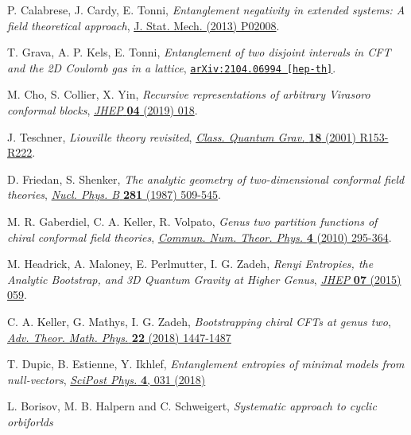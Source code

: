 \documentclass[a4paper,11pt]{article}
\begin{document}
\begin{thebibliography}{99}
 P. Calabrese, J. Cardy, E. Tonni, \emph{Entanglement negativity in extended systems:  A field theoretical approach},
\href{https://doi.org/10.1088/1742-5468/2013/02/P02008}{J. Stat. Mech. (2013) P02008}.

 T. Grava, A. P. Kels, E. Tonni, \emph{Entanglement of two disjoint intervals in CFT and the 2D Coulomb gas in a lattice},
\href{https://arxiv.org/abs/2104.06994}{\texttt{arXiv:2104.06994 [hep-th]}}.

 M. Cho, S. Collier, X. Yin, \emph{Recursive representations of arbitrary Virasoro conformal blocks}, 
\href{https://doi.org/10.1007/JHEP04(2019)018}{\emph{JHEP} {\bf 04} (2019) 018}.

 J. Teschner, \emph{Liouville theory revisited}, \href{https://doi.org/10.1088/0264-9381/18/23/201}{\emph{Class. Quantum Grav.} {\bf 18} (2001) R153-R222}.

 D. Friedan, S. Shenker, \emph{The analytic geometry of two-dimensional conformal field theories}, \href{https://doi.org/10.1016/0550-3213(87)90418-4}{\emph{Nucl. Phys. B} {\bf 281} (1987) 509-545}.

 M. R. Gaberdiel, C. A. Keller, R. Volpato, \emph{Genus two partition functions of chiral conformal field theories},
\href{https://dx.doi.org/10.4310/CNTP.2010.v4.n2.a2}{\emph{Commun. Num. Theor. Phys.} {\bf 4} (2010) 295-364}.

 M. Headrick, A. Maloney, E. Perlmutter, I. G. Zadeh, \emph{Renyi Entropies, the Analytic Bootstrap, and 3D Quantum Gravity at Higher Genus}, \href{https://doi.org/10.1007/JHEP07(2015)059}{\emph{JHEP} {\bf 07} (2015) 059}.

 C. A. Keller, G. Mathys, I. G. Zadeh, \emph{Bootstrapping chiral CFTs at genus two},
\href{https://dx.doi.org/10.4310/ATMP.2018.v22.n6.a3}{\emph{Adv. Theor. Math. Phys.} {\bf 22} (2018) 1447-1487}

 T. Dupic, B. Estienne, Y. Ikhlef, \emph{Entanglement entropies of minimal models from null-vectors}, 
\href{https://scipost.org/10.21468/SciPostPhys.4.6.031}{\emph{SciPost Phys.} {\bf 4}, 031 (2018)}

 L. Borisov, M. B. Halpern and C. Schweigert, \emph{Systematic approach to cyclic orbiforlds}




\end{thebibliography}
\end{document}
